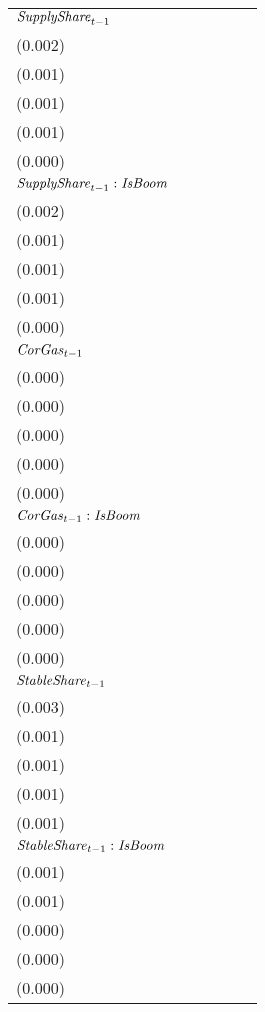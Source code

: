 \begin{tabular}{llllll}
${{\it SupplyShare}}_{t-1}$                 &   \makecell{$0.037^{***}$ \\ (0.002)} &   \makecell{$0.006^{***}$ \\ (0.001)} &   \makecell{$0.003^{***}$ \\ (0.001)} &   \makecell{$0.022^{***}$ \\ (0.001)} &   \makecell{$0.001^{***}$ \\ (0.000)} \\
${{\it SupplyShare}}_{t-1} : {\it IsBoom}$  &     \makecell{$-0.001^{}$ \\ (0.002)} &      \makecell{$0.001^{}$ \\ (0.001)} &     \makecell{$0.001^{*}$ \\ (0.001)} &  \makecell{$-0.009^{***}$ \\ (0.001)} &  \makecell{$-0.002^{***}$ \\ (0.000)} \\
${{\it CorGas}}_{t-1}$                      &     \makecell{$-0.000^{}$ \\ (0.000)} &      \makecell{$0.000^{}$ \\ (0.000)} &     \makecell{$-0.000^{}$ \\ (0.000)} &     \makecell{$-0.000^{}$ \\ (0.000)} &     \makecell{$-0.000^{}$ \\ (0.000)} \\
${{\it CorGas}}_{t-1} : {\it IsBoom}$       &    \makecell{$0.001^{**}$ \\ (0.000)} &     \makecell{$-0.000^{}$ \\ (0.000)} &      \makecell{$0.000^{}$ \\ (0.000)} &      \makecell{$0.000^{}$ \\ (0.000)} &      \makecell{$0.000^{}$ \\ (0.000)} \\
${{\it StableShare}}_{t-1}$                 &   \makecell{$0.126^{***}$ \\ (0.003)} &    \makecell{$0.003^{**}$ \\ (0.001)} &   \makecell{$-0.002^{**}$ \\ (0.001)} &   \makecell{$0.051^{***}$ \\ (0.001)} &   \makecell{$0.019^{***}$ \\ (0.001)} \\
${{\it StableShare}}_{t-1} : {\it IsBoom}$  &  \makecell{$-0.011^{***}$ \\ (0.001)} &  \makecell{$-0.009^{***}$ \\ (0.001)} &  \makecell{$-0.005^{***}$ \\ (0.000)} &  \makecell{$-0.015^{***}$ \\ (0.000)} &  \makecell{$-0.006^{***}$ \\ (0.000)} \\

\end{tabular}
